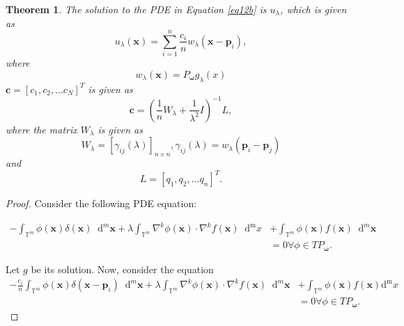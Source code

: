 \documentclass[multixcb]{amstext-l}
\theoremstyle{plain}
\newtheorem{theorem}{Theorem}[chapter]
\theoremstyle{definition}
\theoremstyle{definition}
\theoremstyle{remark}
\numberwithin{equation}{chapter}
\begin{document}
\begin{appendix}
\begin{theorem}
The solution to the PDE in Equation \ref{eq12b} is $u_{\lambda}$, which is given as
\begin{equation}
    \label{exp_th2p}  
  u_{\lambda}(\boldsymbol{x}) = \sum\limits_{i=1}^n \frac{c_i}{n}w_{\lambda}(\boldsymbol{x}-\boldsymbol{p}_i),
 \end{equation}
 where
 \begin{equation}\label{eq22_th2p}
    w_{\lambda}(\boldsymbol{x}) = P_{\boldsymbol{\omega}}g_{\lambda}(x) 
\end{equation}
$\pmb{c} = [c_1,c_2,...c_{N}]^T$ is given as \begin{equation}\label{eq28_thp}
 \pmb{c} = (\frac{1}{n}W_{\lambda}+\frac{1}{\lambda^2}I)^{-1}L,\end{equation} where the matrix $W_{\lambda}$ is given as 
\begin{equation}\label{eq29_th2p}
  W_{\lambda} = [\gamma_{ij}(\lambda)]_{n\times n},\gamma_{ij}(\lambda) = w_{\lambda}(\boldsymbol{p}_i-\boldsymbol{p}_j)\end{equation} and $$L = [q_1,q_2,\ldots q_n]^T.$$ 
\end{theorem}

\begin{proof}

Consider the following PDE equation:

\begin{equation}
\begin{aligned}
\label{sub_ELp}
 -\int_{\mathbb{T}^m} \phi(\boldsymbol{x})\delta(\boldsymbol{x})\mathop{}\!\mathrm{d}^m\boldsymbol{x} + \lambda\int_{\mathbb{T}^m} \nabla^k\phi(\boldsymbol{x})\cdot\nabla^k f(\boldsymbol{x})\mathop{}\!\mathrm{d^m}x &+ \int_{\mathbb{T}^m} \phi(\boldsymbol{x})f(\boldsymbol{x})\mathop{}\!\mathrm{d}^m\boldsymbol{x}\\ &= 0 \forall \phi\in TP_{\boldsymbol{\omega}}.    
\end{aligned}
\end{equation}
      
Let $g$ be its solution. Now, consider the equation 
\begin{equation}
\label{sub_EL_2p}
    \begin{aligned}
        -\frac{c_i}{n}\int_{\mathbb{T}^m} \phi(\boldsymbol{x})\delta(\boldsymbol{x}-\boldsymbol{p}_i)\mathop{}\!\mathrm{d}^m\boldsymbol{x} + \lambda\int_{\mathbb{T}^m} \nabla^k\phi(\boldsymbol{x})\cdot\nabla^k f(\boldsymbol{x})\mathop{}\!\mathrm{d}^m\boldsymbol{x} &+ \int_{\mathbb{T}^m} \phi(\boldsymbol{x})f(\boldsymbol{x})\mathrm{d^m}x\\ &= 0 \forall \phi\in TP_{\boldsymbol{\omega}}.  
    \end{aligned}
\end{equation}


\end{proof}
\end{appendix}
\end{document}
